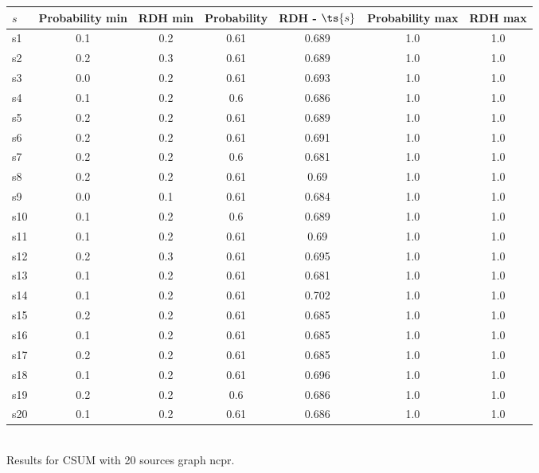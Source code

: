 \documentclass{article}
\begin{document}
\noindent\begin{tabular}{|l|c|c|c|c|c|c|}
\hline
$s$& Probability min & RDH min & Probability & RDH - $\ts{s}$ & Probability max & RDH max\\
\hline
s1 &0.1 & 0.2 & 0.61 & 0.689 & 1.0 & 1.0\\
\hline
s2 &0.2 & 0.3 & 0.61 & 0.689 & 1.0 & 1.0\\
\hline
s3 &0.0 & 0.2 & 0.61 & 0.693 & 1.0 & 1.0\\
\hline
s4 &0.1 & 0.2 & 0.6 & 0.686 & 1.0 & 1.0\\
\hline
s5 &0.2 & 0.2 & 0.61 & 0.689 & 1.0 & 1.0\\
\hline
s6 &0.2 & 0.2 & 0.61 & 0.691 & 1.0 & 1.0\\
\hline
s7 &0.2 & 0.2 & 0.6 & 0.681 & 1.0 & 1.0\\
\hline
s8 &0.2 & 0.2 & 0.61 & 0.69 & 1.0 & 1.0\\
\hline
s9 &0.0 & 0.1 & 0.61 & 0.684 & 1.0 & 1.0\\
\hline
s10 &0.1 & 0.2 & 0.6 & 0.689 & 1.0 & 1.0\\
\hline
s11 &0.1 & 0.2 & 0.61 & 0.69 & 1.0 & 1.0\\
\hline
s12 &0.2 & 0.3 & 0.61 & 0.695 & 1.0 & 1.0\\
\hline
s13 &0.1 & 0.2 & 0.61 & 0.681 & 1.0 & 1.0\\
\hline
s14 &0.1 & 0.2 & 0.61 & 0.702 & 1.0 & 1.0\\
\hline
s15 &0.2 & 0.2 & 0.61 & 0.685 & 1.0 & 1.0\\
\hline
s16 &0.1 & 0.2 & 0.61 & 0.685 & 1.0 & 1.0\\
\hline
s17 &0.2 & 0.2 & 0.61 & 0.685 & 1.0 & 1.0\\
\hline
s18 &0.1 & 0.2 & 0.61 & 0.696 & 1.0 & 1.0\\
\hline
s19 &0.2 & 0.2 & 0.6 & 0.686 & 1.0 & 1.0\\
\hline
s20 &0.1 & 0.2 & 0.61 & 0.686 & 1.0 & 1.0\\
\hline
\end{tabular}\\

\noindent Results for CSUM with 20 sources graph ncpr.
\end{document}
